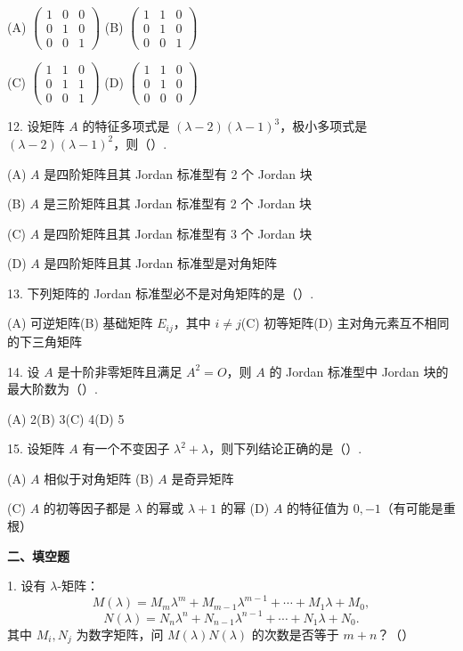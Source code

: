 \documentclass[UTF8,12pt,a4paper,fontset=fandol]{ctexart}
\begin{document}
(A) $\left(\begin{array}{ccc}1&0&0\\0&1&0\\0&0&1\end{array}\right)$\quad
(B) $\left(\begin{array}{ccc}1&1&0\\0&1&0\\0&0&1\end{array}\right)$

(C) $\left(\begin{array}{ccc}1&1&0\\0&1&1\\0&0&1\end{array}\right)$\quad
(D) $\left(\begin{array}{ccc}1&1&0\\0&1&0\\0&0&0\end{array}\right)$

12. 设矩阵 $A$ 的特征多项式是 $(\lambda-2)(\lambda-1)^3$，极小多项式是 $(\lambda-2)(\lambda-1)^2$，则（\quad）.

(A) $A$ 是四阶矩阵且其 Jordan 标准型有 2 个 Jordan 块

(B) $A$ 是三阶矩阵且其 Jordan 标准型有 2 个 Jordan 块

(C) $A$ 是四阶矩阵且其 Jordan 标准型有 3 个 Jordan 块

(D) $A$ 是四阶矩阵且其 Jordan 标准型是对角矩阵

13. 下列矩阵的 Jordan 标准型必不是对角矩阵的是（\quad）.

(A) 可逆矩阵\quad (B) 基础矩阵 $E_{ij}$，其中 $i\ne j$\quad (C) 初等矩阵\quad (D) 主对角元素互不相同的下三角矩阵

14. 设 $A$ 是十阶非零矩阵且满足 $A^2=O$，则 $A$ 的 Jordan 标准型中 Jordan 块的最大阶数为（\quad）.

(A) 2\quad (B) 3\quad (C) 4\quad (D) 5

15. 设矩阵 $A$ 有一个不变因子 $\lambda^2+\lambda$，则下列结论正确的是（\quad）.

(A) $A$ 相似于对角矩阵\quad
(B) $A$ 是奇异矩阵

(C) $A$ 的初等因子都是 $\lambda$ 的幂或 $\lambda+1$ 的幂\quad
(D) $A$ 的特征值为 $0,-1$（有可能是重根）

\noindent\textbf{二、填空题}

1. 设有 $\lambda$-矩阵：
\[
M(\lambda)=M_m\lambda^m+M_{m-1}\lambda^{m-1}+\cdots+M_1\lambda+M_0,
\]
\[
N(\lambda)=N_n\lambda^n+N_{n-1}\lambda^{n-1}+\cdots+N_1\lambda+N_0.
\]
其中 $M_i,N_j$ 为数字矩阵，问 $M(\lambda)N(\lambda)$ 的次数是否等于 $m+n$？（\quad）
\end{document}

